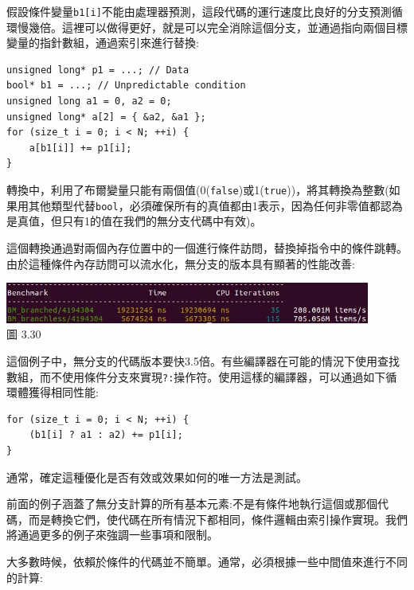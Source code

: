 假設條件變量\texttt{b1[i]}不能由處理器預測，這段代碼的運行速度比良好的分支預測循環慢幾倍。這裡可以做得更好，就是可以完全消除這個分支，並通過指向兩個目標變量的指針數組，通過索引來進行替換:

\begin{lstlisting}[style=styleCXX]
unsigned long* p1 = ...; // Data
bool* b1 = ...; // Unpredictable condition
unsigned long a1 = 0, a2 = 0;
unsigned long* a[2] = { &a2, &a1 };
for (size_t i = 0; i < N; ++i) {
	a[b1[i]] += p1[i];
}
\end{lstlisting}

轉換中，利用了布爾變量只能有兩個值(0(\texttt{false})或1(\texttt{true}))，將其轉換為整數(如果用其他類型代替\texttt{bool}，必須確保所有的真值都由1表示，因為任何非零值都認為是真值，但只有1的值在我們的無分支代碼中有效)。

這個轉換通過對兩個內存位置中的一個進行條件訪問，替換掉指令中的條件跳轉。由於這種條件內存訪問可以流水化，無分支的版本具有顯著的性能改善:

\begin{center}
\includegraphics[width=0.9\textwidth]{content/1/chapter3/images/30.jpg}\\
圖 3.30
\end{center}

這個例子中，無分支的代碼版本要快3.5倍。有些編譯器在可能的情況下使用查找數組，而不使用條件分支來實現\texttt{?:}操作符。使用這樣的編譯器，可以通過如下循環體獲得相同性能:

\begin{lstlisting}[style=styleCXX]
for (size_t i = 0; i < N; ++i) {
	(b1[i] ? a1 : a2) += p1[i];
}
\end{lstlisting}

通常，確定這種優化是否有效或效果如何的唯一方法是測試。

前面的例子涵蓋了無分支計算的所有基本元素:不是有條件地執行這個或那個代碼，而是轉換它們，使代碼在所有情況下都相同，條件邏輯由索引操作實現。我們將通過更多的例子來強調一些事項和限制。


大多數時候，依賴於條件的代碼並不簡單。通常，必須根據一些中間值來進行不同的計算:

